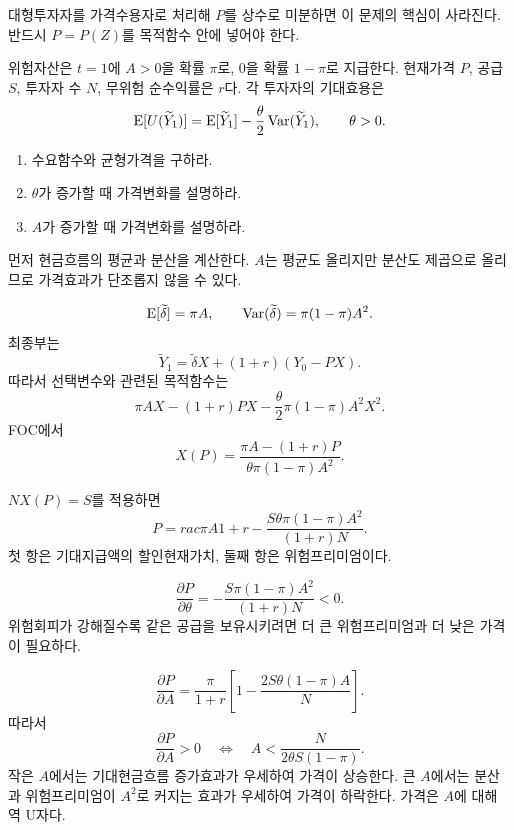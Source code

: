 \begin{warningbox}
대형투자자를 가격수용자로 처리해 $P$를 상수로 미분하면 이 문제의 핵심이 사라진다. 반드시 $P=P(Z)$를 목적함수 안에 넣어야 한다.
\end{warningbox}

\begin{officialbox}
위험자산은 $t=1$에 $A>0$을 확률 $\pi$로, 0을 확률 $1-\pi$로 지급한다. 현재가격 $P$, 공급 $S$, 투자자 수 $N$, 무위험 순수익률은 $r$다. 각 투자자의 기대효용은
\[
\operatorname{E}[U(\widetilde Y_1)]=\operatorname{E}[\widetilde Y_1]-\frac\theta2\operatorname{Var}(\widetilde Y_1),\qquad\theta>0.
\]
\begin{enumerate}[label=(\alph*)]
\item 수요함수와 균형가격을 구하라.
\item $\theta$가 증가할 때 가격변화를 설명하라.
\item $A$가 증가할 때 가격변화를 설명하라.
\end{enumerate}
\end{officialbox}

\begin{strategybox}
먼저 현금흐름의 평균과 분산을 계산한다. $A$는 평균도 올리지만 분산도 제곱으로 올리므로 가격효과가 단조롭지 않을 수 있다.
\end{strategybox}

\begin{solutionbox}
\[
\operatorname{E}[\widetilde\delta]=\pi A,
\qquad
\operatorname{Var}(\widetilde\delta)=\pi(1-\pi)A^2.
\]
최종부는
\[
\widetilde Y_1=\widetilde\delta X+(1+r)(Y_0-PX).
\]
따라서 선택변수와 관련된 목적함수는
\[
\pi AX-(1+r)PX-\frac\theta2\pi(1-\pi)A^2X^2.
\]
FOC에서
\[
\boxed{X(P)=\frac{\pi A-(1+r)P}{\theta\pi(1-\pi)A^2}}.
\]

$NX(P)=S$를 적용하면
\[
\boxed{P=rac{\pi A}{1+r}
-\frac{S\theta\pi(1-\pi)A^2}{(1+r)N}}.
\]
첫 항은 기대지급액의 할인현재가치, 둘째 항은 위험프리미엄이다.

\[
\frac{\partial P}{\partial\theta}
=-\frac{S\pi(1-\pi)A^2}{(1+r)N}<0.
\]
위험회피가 강해질수록 같은 공급을 보유시키려면 더 큰 위험프리미엄과 더 낮은 가격이 필요하다.

\[
\frac{\partial P}{\partial A}
=\frac{\pi}{1+r}\left[1-\frac{2S\theta(1-\pi)A}{N}\right].
\]
따라서
\[
\frac{\partial P}{\partial A}>0
\quad\Longleftrightarrow\quad
A<\frac{N}{2\theta S(1-\pi)}.
\]
작은 $A$에서는 기대현금흐름 증가효과가 우세하여 가격이 상승한다. 큰 $A$에서는 분산과 위험프리미엄이 $A^2$로 커지는 효과가 우세하여 가격이 하락한다. 가격은 $A$에 대해 역 U자다.
\end{solutionbox}

